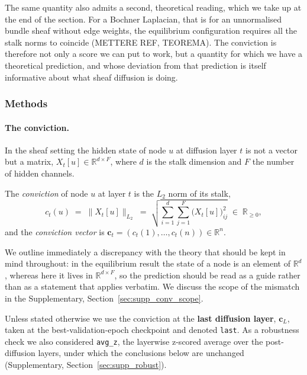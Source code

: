 The same quantity also admits a second, theoretical reading, which we take up at
the end of the section. For a Bochner Laplacian, that is for an unnormalised
bundle sheaf without edge weights, the equilibrium configuration requires all
the stalk norms to coincide (METTERE REF, TEOREMA). The conviction is therefore
not only a score we can put to work, but a quantity for which we have a
theoretical prediction, and whose deviation from that prediction is itself
informative about what sheaf diffusion is doing.

\subsubsection{Methods}

\paragraph{The conviction.}
In the sheaf setting the hidden state of node $u$ at diffusion layer $t$ is not
a vector but a matrix, $X_t[u] \in \mathbb{R}^{d \times F}$, where $d$ is the
stalk dimension and $F$ the number of hidden channels.

\begin{definition}[Conviction]
\label{def:conviction}
The \emph{conviction} of node $u$ at layer $t$ is the $L_2$ norm of its stalk,
\[
    c_t(u) \;=\; \bigl\| X_t[u] \bigr\|_{L_2}
    \;=\; \sqrt{\sum_{i=1}^{d}\sum_{j=1}^{F} \bigl(X_t[u]\bigr)_{ij}^2}
    \;\in\; \mathbb{R}_{\geq 0},
\]
and the \emph{conviction vector} is
$\mathbf{c}_t = (c_t(1),\dots,c_t(n)) \in \mathbb{R}^n$.
\end{definition}

We outline immediately a discrepancy with the theory that should be kept in mind
throughout: in the equilibrium result the state of a node is an element of
$\mathbb{R}^d$, whereas here it lives in $\mathbb{R}^{d \times F}$, so the
prediction should be read as a guide rather than as a statement that applies
verbatim. We discuss the scope of the mismatch in the Supplementary,
Section~\ref{sec:supp_conv_scope}.

Unless stated otherwise we use the conviction at the \textbf{last diffusion
layer}, $\mathbf{c}_L$, taken at the best-validation-epoch checkpoint and
denoted \texttt{last}. As a robustness check we also considered
\texttt{avg\_z}, the layerwise z-scored average over the post-diffusion layers,
under which the conclusions below are unchanged (Supplementary,
Section~\ref{sec:supp_robust}).

